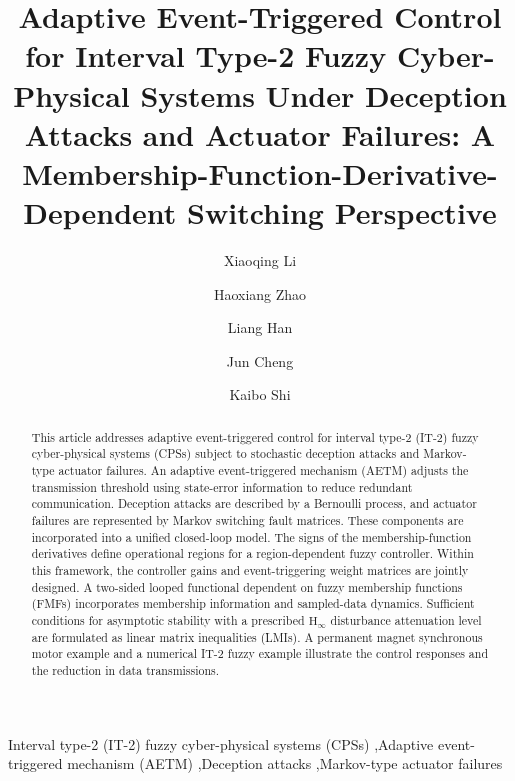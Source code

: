 \documentclass[preprint,review,fleqn,sort&compress,3p]{elsarticle}
\theoremstyle{definition} %
\theoremstyle{definition}%
\begin{document}
	\begin{frontmatter}
		
		\title{{Adaptive Event-Triggered Control for 
				Interval Type-2 Fuzzy Cyber-Physical Systems Under Deception Attacks 
				and Actuator Failures: A Membership-Function-Derivative-Dependent 
				Switching Perspective
		}}
		
		\author[a]{Xiaoqing Li}
		\author[a]{Haoxiang Zhao}
		\author[a]{Liang Han}
		\author[b]{Jun Cheng}
		\author[c]{Kaibo Shi}
		
		\address[a]{School of Electrical Engineering and Automation, Hefei University of Technology, Hefei 230009, China}
		\address[b]{College of Mathematics and Statistics, Guangxi Normal University, Guilin 541006, China}
		\address[c]{School of Electronic Information and Electrical Engineering, Chengdu University, Chengdu 610106, China}
		
		{}
		
\begin{abstract}
This article addresses adaptive event-triggered control for interval type-2 (IT-2) fuzzy cyber-physical systems (CPSs) subject to stochastic deception attacks and Markov-type actuator failures. An adaptive event-triggered mechanism (AETM) adjusts the transmission threshold using state-error information to reduce redundant communication. Deception attacks are described by a Bernoulli process, and actuator failures are represented by Markov switching fault matrices. These components are incorporated into a unified closed-loop model. The signs of the membership-function derivatives define operational regions for a region-dependent fuzzy controller. Within this framework, the controller gains and event-triggering weight matrices are jointly designed. A two-sided looped functional dependent on fuzzy membership functions (FMFs) incorporates membership information and sampled-data dynamics. Sufficient conditions for asymptotic stability with a prescribed $\mathrm{H}_\infty$ disturbance attenuation level are formulated as linear matrix inequalities (LMIs). A permanent magnet synchronous motor example and a numerical IT-2 fuzzy example illustrate the control responses and the reduction in data transmissions.

\end{abstract}

\begin{keyword}
	Interval type-2 (IT-2) fuzzy cyber-physical systems (CPSs) \sep Adaptive 
	event-triggered mechanism (AETM) \sep Deception attacks \sep Markov-type actuator failures 
\end{keyword}
		
\end{frontmatter}
	
\end{document}
